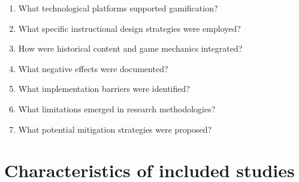 \documentclass[a4paper,fleqn]{cas-sc}
\begin{document}
\begin{enumerate}[noitemsep]
 \item %
What technological platforms supported gamification?
 
 \item %
What specific instructional design strategies were employed?

 \item %
How were historical content and game mechanics integrated?

 \item %
What negative effects were documented?
 
 \item %
What implementation barriers were identified?
 
 \item %
What limitations emerged in research methodologies?

 \item %
What potential mitigation strategies were proposed?
 
\end{enumerate}

\section{Characteristics of included studies}
\end{document}
